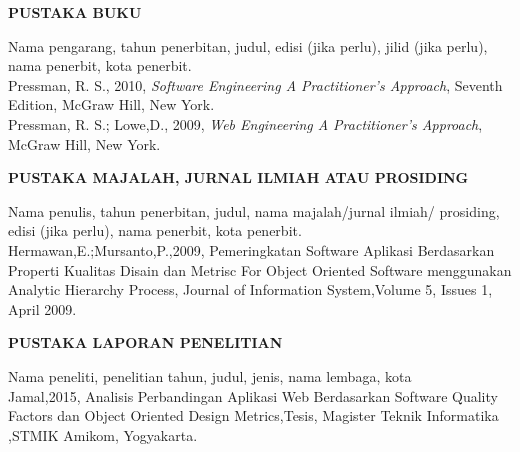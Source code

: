 \documentclass[oneside,listof=totoc]{scrbook}
\begin{document}
\begin{singlespace}
\noindent\textbf{PUSTAKA BUKU}\\

\begin{hangparas}{25pt}{1}
Nama pengarang, tahun penerbitan, judul, edisi (jika perlu), jilid (jika perlu), nama penerbit, kota penerbit.\\

Pressman, R. S., 2010, \textit{Software Engineering A Practitioner’s Approach}, Seventh Edition, McGraw Hill, New York.\\

Pressman, R. S.; Lowe,D., 2009, \textit{Web Engineering A Practitioner’s Approach}, McGraw Hill, New York.\\
\end{hangparas}

\vspace{0.5cm}

\noindent\textbf{PUSTAKA MAJALAH, JURNAL ILMIAH ATAU PROSIDING}\\

\begin{hangparas}{25pt}{1}
Nama penulis, tahun penerbitan, judul, nama majalah/jurnal ilmiah/ prosiding, edisi (jika perlu), nama penerbit, kota penerbit.\\

Hermawan,E.;Mursanto,P.,2009, Pemeringkatan Software Aplikasi Berdasarkan Properti Kualitas Disain dan Metrisc For Object Oriented Software menggunakan Analytic Hierarchy Process, Journal of Information System,Volume 5, Issues 1, April 2009.\\
\end{hangparas}

\vspace{0.5cm}

\noindent\textbf{PUSTAKA LAPORAN PENELITIAN}\\

\begin{hangparas}{25pt}{1}
Nama peneliti, penelitian tahun, judul, jenis, nama lembaga, kota\\

Jamal,2015, Analisis Perbandingan Aplikasi Web Berdasarkan Software Quality Factors dan Object Oriented Design Metrics,Tesis, Magister Teknik Informatika ,STMIK Amikom, Yogyakarta.\\
\end{hangparas}
\vspace{0.5cm}


\end{singlespace}
\end{document}

